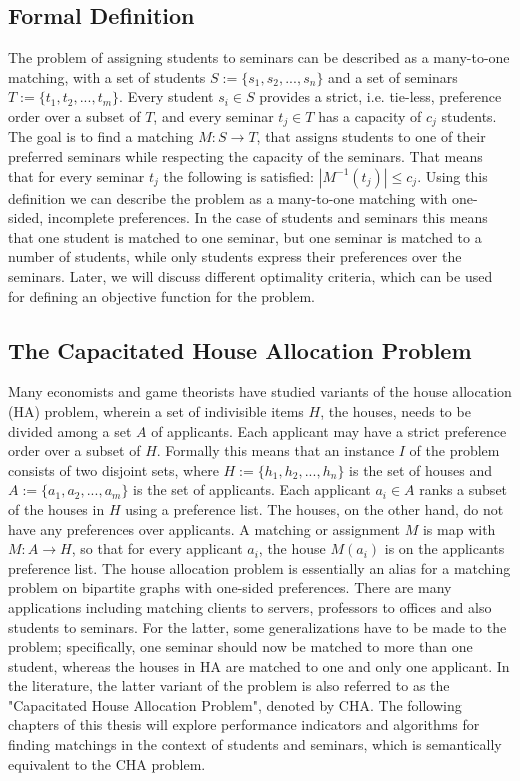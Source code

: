 \subsection{Formal Definition}
The problem of assigning students to seminars can be described as a many-to-one matching, with a set of students $S:= \{s_1, s_2, ...,s_n\}$ and a set of seminars $T:= \{t_1, t_2, ..., t_m\}$. Every student $s_i \in S$ provides a strict, i.e. tie-less, preference order over a subset of $T$, and every seminar $t_j \in T$ has a capacity of $c_j$ students. The goal is to find a matching $M: S \rightarrow T$, that assigns students to one of their preferred seminars while respecting the capacity of the seminars. That means that for every seminar $t_j$ the following is satisfied: $|M^{-1}(t_j)| \leq c_j$. Using this definition we can describe the problem as a many-to-one matching with one-sided, incomplete preferences. In the case of students and seminars this means that one student is matched to one seminar, but one seminar is matched to a number of students, while only students express their preferences over the seminars. Later, we will discuss different optimality criteria, which can be used for defining an objective function for the problem.

\subsection{The Capacitated House Allocation Problem}\label{intro:cha}
Many economists and game theorists\cite{FEKETE2003219} have studied variants of the house allocation (HA) problem, wherein a set of indivisible items $H$, the houses, needs to be divided among a set $A$ of applicants. Each applicant may have a strict preference order over a subset of $H$. Formally this means that an instance $I$ of the problem consists of two disjoint sets, where $H := \{h_1, h_2, ..., h_n\}$ is the set of houses and $A := \{a_1, a_2, ..., a_m\}$ is the set of applicants. Each applicant $a_i \in A$ ranks a subset of the houses in $H$ using a preference list. The houses, on the other hand, do not have any preferences over applicants. A matching or assignment $M$ is map with $M: A \rightarrow H$, so that for every applicant $a_i$, the house $M(a_i)$ is on the applicants preference list.\cite{SngThesis} 
\newline
The house allocation problem is essentially an alias for a matching problem on bipartite graphs with one-sided preferences. There are many applications including matching clients to servers, professors to offices and also students to seminars. For the latter, some generalizations have to be made to the problem; specifically, one seminar should now be matched to more than one student, whereas the houses in HA are matched to one and only one applicant. In the literature, the latter variant of the problem is also referred to as the "Capacitated House Allocation Problem", denoted by CHA.\cite{algorithmics} The following chapters of this thesis will explore performance indicators and algorithms for finding matchings in the context of students and seminars, which is semantically equivalent to the CHA problem.

